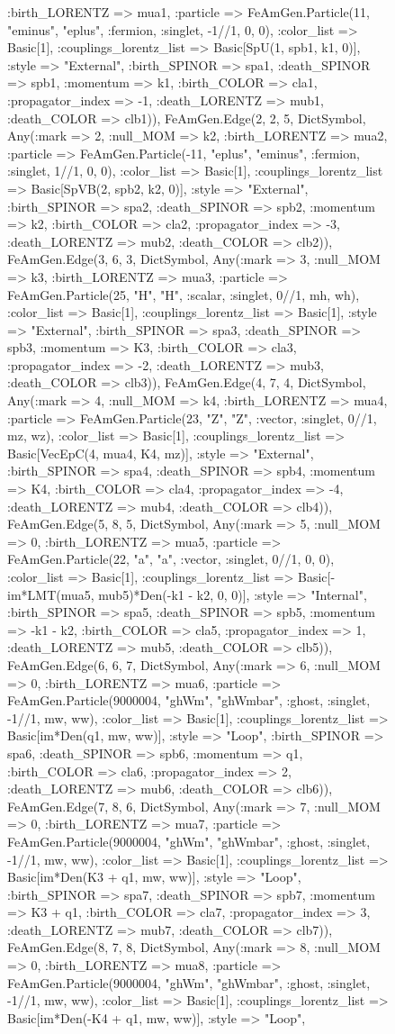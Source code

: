 \documentclass{revtex4}
\begin{document}
\begin{figure}[!htb]
\begin{center}
{:birth_LORENTZ => mua1, :particle => FeAmGen.Particle(11, "eminus", "eplus", :fermion, :singlet, -1//1, 0, 0), :color_list => Basic[1], :couplings_lorentz_list => Basic[SpU(1, spb1, k1, 0)], :style => "External", :birth_SPINOR => spa1, :death_SPINOR => spb1, :momentum => k1, :birth_COLOR => cla1, :propagator_index => -1, :death_LORENTZ => mub1, :death_COLOR => clb1)), FeAmGen.Edge(2, 2, 5, Dict{Symbol, Any}(:mark => 2, :null_MOM => k2, :birth_LORENTZ => mua2, :particle => FeAmGen.Particle(-11, "eplus", "eminus", :fermion, :singlet, 1//1, 0, 0), :color_list => Basic[1], :couplings_lorentz_list => Basic[SpVB(2, spb2, k2, 0)], :style => "External", :birth_SPINOR => spa2, :death_SPINOR => spb2, :momentum => k2, :birth_COLOR => cla2, :propagator_index => -3, :death_LORENTZ => mub2, :death_COLOR => clb2)), FeAmGen.Edge(3, 6, 3, Dict{Symbol, Any}(:mark => 3, :null_MOM => k3, :birth_LORENTZ => mua3, :particle => FeAmGen.Particle(25, "H", "H", :scalar, :singlet, 0//1, mh, wh), :color_list => Basic[1], :couplings_lorentz_list => Basic[1], :style => "External", :birth_SPINOR => spa3, :death_SPINOR => spb3, :momentum => K3, :birth_COLOR => cla3, :propagator_index => -2, :death_LORENTZ => mub3, :death_COLOR => clb3)), FeAmGen.Edge(4, 7, 4, Dict{Symbol, Any}(:mark => 4, :null_MOM => k4, :birth_LORENTZ => mua4, :particle => FeAmGen.Particle(23, "Z", "Z", :vector, :singlet, 0//1, mz, wz), :color_list => Basic[1], :couplings_lorentz_list => Basic[VecEpC(4, mua4, K4, mz)], :style => "External", :birth_SPINOR => spa4, :death_SPINOR => spb4, :momentum => K4, :birth_COLOR => cla4, :propagator_index => -4, :death_LORENTZ => mub4, :death_COLOR => clb4)), FeAmGen.Edge(5, 8, 5, Dict{Symbol, Any}(:mark => 5, :null_MOM => 0, :birth_LORENTZ => mua5, :particle => FeAmGen.Particle(22, "a", "a", :vector, :singlet, 0//1, 0, 0), :color_list => Basic[1], :couplings_lorentz_list => Basic[-im*LMT(mua5, mub5)*Den(-k1 - k2, 0, 0)], :style => "Internal", :birth_SPINOR => spa5, :death_SPINOR => spb5, :momentum => -k1 - k2, :birth_COLOR => cla5, :propagator_index => 1, :death_LORENTZ => mub5, :death_COLOR => clb5)), FeAmGen.Edge(6, 6, 7, Dict{Symbol, Any}(:mark => 6, :null_MOM => 0, :birth_LORENTZ => mua6, :particle => FeAmGen.Particle(9000004, "ghWm", "ghWmbar", :ghost, :singlet, -1//1, mw, ww), :color_list => Basic[1], :couplings_lorentz_list => Basic[im*Den(q1, mw, ww)], :style => "Loop", :birth_SPINOR => spa6, :death_SPINOR => spb6, :momentum => q1, :birth_COLOR => cla6, :propagator_index => 2, :death_LORENTZ => mub6, :death_COLOR => clb6)), FeAmGen.Edge(7, 8, 6, Dict{Symbol, Any}(:mark => 7, :null_MOM => 0, :birth_LORENTZ => mua7, :particle => FeAmGen.Particle(9000004, "ghWm", "ghWmbar", :ghost, :singlet, -1//1, mw, ww), :color_list => Basic[1], :couplings_lorentz_list => Basic[im*Den(K3 + q1, mw, ww)], :style => "Loop", :birth_SPINOR => spa7, :death_SPINOR => spb7, :momentum => K3 + q1, :birth_COLOR => cla7, :propagator_index => 3, :death_LORENTZ => mub7, :death_COLOR => clb7)), FeAmGen.Edge(8, 7, 8, Dict{Symbol, Any}(:mark => 8, :null_MOM => 0, :birth_LORENTZ => mua8, :particle => FeAmGen.Particle(9000004, "ghWm", "ghWmbar", :ghost, :singlet, -1//1, mw, ww), :color_list => Basic[1], :couplings_lorentz_list => Basic[im*Den(-K4 + q1, mw, ww)], :style => "Loop", }
\end{center}
\end{figure}
\end{document}
